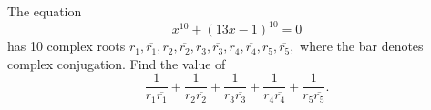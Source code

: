 The equation \[ x^{10}+(13x-1)^{10}=0 \] has 10 complex roots $r_1, \overline{r_1}, r_2, \overline{r_2}, r_3, \overline{r_3}, r_4, \overline{r_4}, r_5, \overline{r_5},$ where the bar denotes complex conjugation.  Find the value of \[ \frac 1{r_1\overline{r_1}}+\frac 1{r_2\overline{r_2}}+\frac 1{r_3\overline{r_3}}+\frac 1{r_4\overline{r_4}}+\frac 1{r_5\overline{r_5}}. \]
